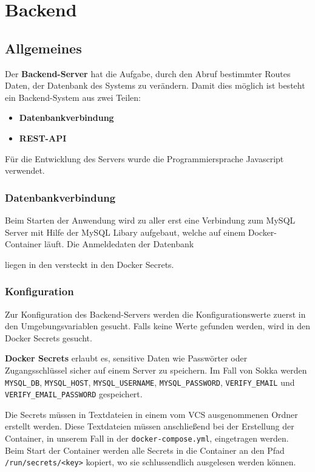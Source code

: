 \part{Backend}
\label{backend}

\chapter{Allgemeines}

Der \textbf{Backend-Server} hat die Aufgabe, durch den Abruf bestimmter Routes Daten, der Datenbank des Systems zu verändern. Damit dies möglich ist besteht ein Backend-System aus zwei Teilen:

\begin{itemize}
    \item \textbf{Datenbankverbindung}
    \item \textbf{REST-API}
\end{itemize}

Für die Entwicklung des Servers wurde die Programmiersprache Javascript verwendet.

\section{Datenbankverbindung}

Beim Starten der Anwendung wird zu aller erst eine Verbindung zum MySQL Server mit Hilfe der MySQL Libary aufgebaut, welche auf einem Docker-Container läuft. Die Anmeldedaten der Datenbank

liegen in den versteckt in den Docker Secrets.



\section{Konfiguration}

Zur Konfiguration des Backend-Servers werden die Konfigurationswerte zuerst in den Umgebungsvariablen gesucht. Falls keine Werte gefunden werden, wird in den Docker Secrets gesucht.

\label{dockersecrets}

\textbf{Docker Secrets} erlaubt es, sensitive Daten wie Passwörter oder Zugangsschlüssel sicher auf einem Server zu speichern. Im Fall von Sokka werden \lstinline{MYSQL_DB}, \lstinline{MYSQL_HOST}, \lstinline{MYSQL_USERNAME}, \lstinline{MYSQL_PASSWORD}, \lstinline{VERIFY_EMAIL} und \lstinline{VERIFY_EMAIL_PASSWORD} gespeichert.

Die Secrets müssen in Textdateien in einem vom VCS ausgenommenen Ordner erstellt werden. Diese Textdateien müssen anschließend bei der Erstellung der Container, in unserem Fall in der \lstinline{docker-compose.yml}, eingetragen werden. Beim Start der Container werden alle Secrets in die Container an den Pfad \lstinline{/run/secrets/<key>} kopiert, wo sie schlussendlich ausgelesen werden können.

